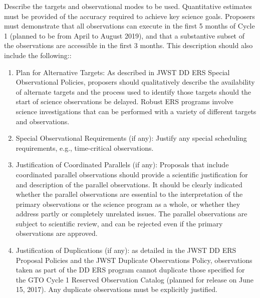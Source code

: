 
Describe the targets and observational modes to be used. Quantitative
estimates must be provided of the accuracy required to achieve key
science goals. Proposers must demonstrate that all observations can
execute in the first 5 months of Cycle 1 (planned to be from April to
August 2019), and that a substantive subset of the observations are
accessible in the first 3 months. This description should also include
the following::

\begin{enumerate}[label=\alph*]
    \item{Plan for Alternative Targets: As described in JWST DD ERS
        Special Observational Policies, proposers should qualitatively
        describe the availability of alternate targets and the process used to
        identify those targets should the start of science observations be
        delayed.  Robust ERS programs involve science investigations that can
        be performed with a variety of different targets and observations. }
      
    \item{Special Observational Requirements (if any): Justify any
        special scheduling requirements, e.g., time-critical observations.}

    \item{Justification of Coordinated Parallels (if any): Proposals
        that include coordinated parallel observations should provide a
        scientific justification for and description of the parallel
        observations. It should be clearly indicated whether the parallel
        observations are essential to the interpretation of the primary
        observations or the science program as a whole, or whether they
        address partly or completely unrelated issues. The parallel
        observations are subject to scientific review, and can be rejected
        even if the primary observations are approved.}

    \item{Justification of Duplications (if any): as detailed in the JWST
        DD ERS Proposal Policies and the JWST Duplicate Observations Policy,
        observations taken as part of the DD ERS program cannot duplicate
        those specified for the GTO Cycle 1 Reserved Observation Catalog
        (planned for release on June 15, 2017). Any duplicate observations
        must be explicitly justified.}
\end{enumerate}


